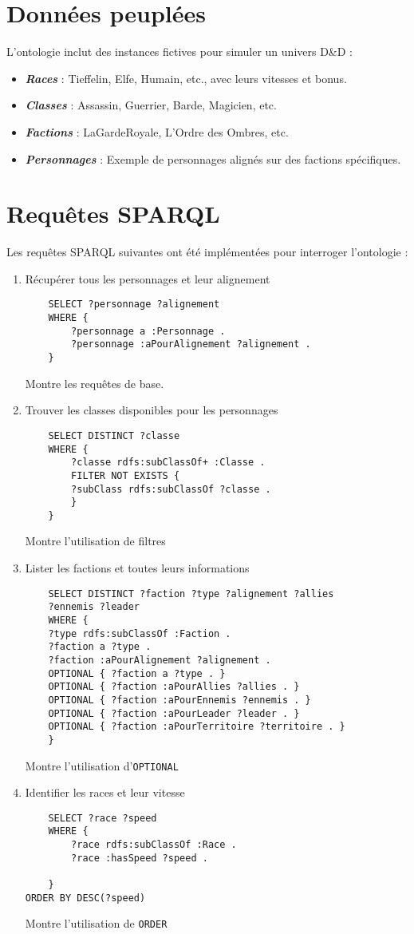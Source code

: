 \documentclass{article}
\newcommand{\cmd}[1]{\texttt{#1}}
\newcommand{\ib}[1]{\textit{\textbf{#1}}}
\begin{document}
\section{Données peuplées}

L'ontologie inclut des instances fictives pour simuler un univers D\&D :

\begin{itemize}
	\item \ib{Races} : Tieffelin, Elfe, Humain, etc., avec leurs vitesses et bonus.
	\item \ib{Classes} : Assassin, Guerrier, Barde, Magicien, etc.
	\item \ib{Factions} : LaGardeRoyale, L'Ordre des Ombres, etc.
	\item \ib{Personnages} : Exemple de personnages alignés sur des factions spécifiques.
\end{itemize}

\section{Requêtes SPARQL}

Les requêtes SPARQL suivantes ont été implémentées pour interroger l'ontologie :

\begin{enumerate}
	\item Récupérer tous les personnages et leur alignement
	\begin{lstlisting}
	SELECT ?personnage ?alignement
	WHERE {
		?personnage a :Personnage .
		?personnage :aPourAlignement ?alignement .
	}
	\end{lstlisting}
Montre les requêtes de base.
	\item Trouver les classes disponibles pour les personnages
	\begin{lstlisting}
	SELECT DISTINCT ?classe
	WHERE {
		?classe rdfs:subClassOf+ :Classe .
		FILTER NOT EXISTS {
		?subClass rdfs:subClassOf ?classe .
		}
	}
	\end{lstlisting}
Montre l'utilisation de filtres
\newpage
	\item Lister les factions et toutes leurs informations
	\begin{lstlisting}
	SELECT DISTINCT ?faction ?type ?alignement ?allies
	?ennemis ?leader
	WHERE {
	?type rdfs:subClassOf :Faction .
	?faction a ?type .
	?faction :aPourAlignement ?alignement .
	OPTIONAL { ?faction a ?type . }
	OPTIONAL { ?faction :aPourAllies ?allies . }
	OPTIONAL { ?faction :aPourEnnemis ?ennemis . }
	OPTIONAL { ?faction :aPourLeader ?leader . }
	OPTIONAL { ?faction :aPourTerritoire ?territoire . }
	}
	\end{lstlisting}
Montre l'utilisation d'\cmd{OPTIONAL}
	\item Identifier les races et leur vitesse
	\begin{lstlisting}
	SELECT ?race ?speed
	WHERE {
		?race rdfs:subClassOf :Race .
		?race :hasSpeed ?speed .
		
	}
ORDER BY DESC(?speed)
	\end{lstlisting}
Montre l'utilisation de \cmd{ORDER}
\end{enumerate}
\end{document}
